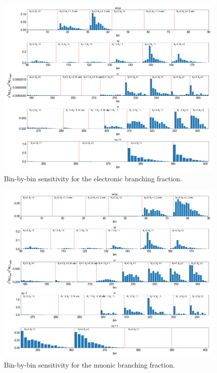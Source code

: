 \begin{figure}[htb!]
    \centering
    \includegraphics[width=1.2\textwidth, angle=-90]{chapters/Analysis/sectionStatisticalAnalysis/figures/beta_e_scan_bins_lh}
    \caption{Bin-by-bin sensitivity for the electronic branching fraction. }
    \label{fig:analysis:method:mle:ele_scan_bins}
\end{figure}

\begin{figure}[htb!]
    \centering
    \includegraphics[width=1.2\textwidth, angle=-90]{chapters/Analysis/sectionStatisticalAnalysis/figures/beta_mu_scan_bins_lh}
    \caption{Bin-by-bin sensitivity for the muonic branching fraction.}
    \label{fig:analysis:method:mle:mu_scan_bins}
\end{figure}

